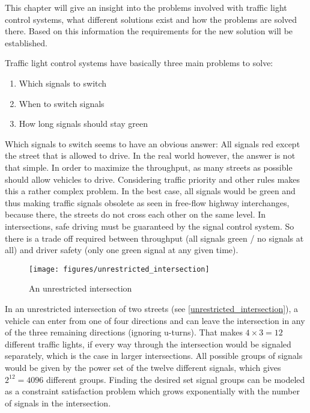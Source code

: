 This chapter will give an insight into the problems involved with traffic light control systems, what different solutions exist and how the problems are solved there. Based on this information the requirements for the new solution will be established.

Traffic light control systems have basically three main problems to solve:

\begin{enumerate}
	\item Which signals to switch
	\item When to switch signals
	\item How long signals should stay green
\end{enumerate}

Which signals to switch seems to have an obvious answer: All signals red except the street that is allowed to drive. In the real world however, the answer is not that simple. In order to maximize the throughput, as many streets as possible should allow vehicles to drive. Considering traffic priority and other rules makes this a rather complex problem. In the best case, all signals would be green and thus making traffic signals obsolete as seen in free-flow highway interchanges, because there, the streets do not cross each other on the same level. In intersections, safe driving must be guaranteed by the signal control system. So there is a trade off required between throughput (all signals green / no signals at all) and driver safety (only one green signal at any given time). \cite{intersection_collision_avoidance}

\begin{figure}[ht]
	\centering
	\texttt{[image: figures/unrestricted\_intersection]}
	\caption{An unrestricted intersection}
	\label{unrestricted_intersection}
\end{figure}

In an unrestricted intersection of two streets (see \autoref{unrestricted_intersection}), a vehicle can enter from one of four directions and can leave the intersection in any of the three remaining directions (ignoring u-turns). That makes $4 \times 3 = 12$ different traffic lights, if every way through the intersection would be signaled separately, which is the case in larger intersections. All possible groups of signals would be given by the power set of the twelve different signals, which gives $2^{12} = 4096$ different groups. Finding the desired set signal groups can be modeled as a constraint satisfaction problem which grows exponentially with the number of signals in the intersection.


